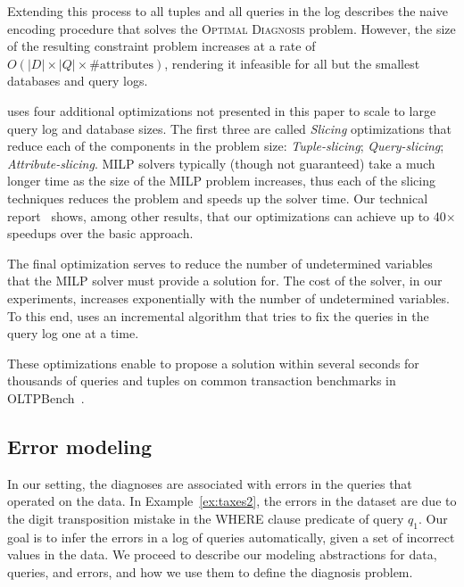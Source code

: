 Extending this process to all tuples and all queries in the log 
describes the naive encoding procedure that solves the
\textsc{Optimal Diagnosis} problem.
However, the size of the resulting constraint problem increases 
at a rate of $O(|D|\times |Q|\times \mathrm{\#attributes})$, rendering
it infeasible for all but the smallest databases and query logs.


\sys uses four additional optimizations not presented in this paper 
to scale to large query log and database sizes.  The first three are
called {\it Slicing} optimizations that reduce each of the components in the problem size:
{\it Tuple-slicing}; {\it Query-slicing}; {\it Attribute-slicing}. 
MILP solvers typically (though not guaranteed) take a much longer time as the size of the MILP problem increases, thus
each of the slicing techniques reduces the problem and speeds up the solver time. 
Our technical report~\cite{qfixarxiv} shows, among other results, that our optimizations
can achieve up to 40$\times$ speedups over the basic approach.

The final optimization serves to reduce the number of undetermined variables that the MILP solver must
provide a solution for.  The cost of the solver, in our experiments, increases exponentially with the number of 
undetermined variables.  To this end, \sys uses an incremental algorithm that tries to fix the queries in the query
log one at a time.

These optimizations enable \sys to propose a solution within several seconds for thousands of 
queries and tuples on common transaction benchmarks in OLTPBench~\cite{oltpbench}.


















% 

\subsection{Error modeling}
\label{sec:model}

In our setting, the diagnoses are associated with errors in the queries that
operated on the data. In Example~\ref{ex:taxes2}, the errors in the dataset
are due to the digit transposition mistake in the WHERE clause predicate of
query $q_1$. Our goal is to infer the errors in a log of queries
automatically, given a set of incorrect values in the data. We proceed to
describe our modeling abstractions for data, queries, and errors, and how we
use them to define the diagnosis problem.

